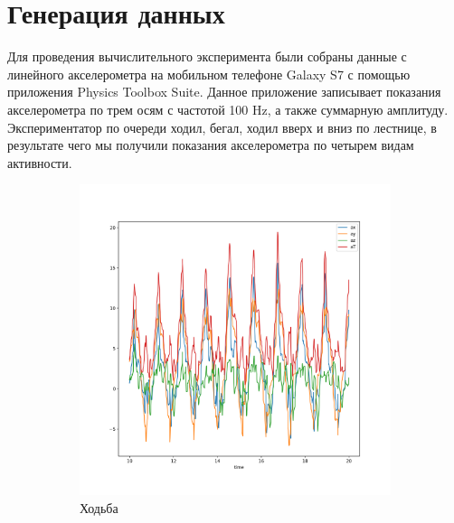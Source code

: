 \documentclass[12pt, fleqn, unicode]{article}
\begin{document}
\newpage
\section{Генерация данных}

Для проведения вычислительного эксперимента были собраны данные с линейного
акселерометра на мобильном телефоне Galaxy S7 с помощью приложения
Physics Toolbox Suite. %
Данное приложение записывает показания акселерометра по трем осям с частотой 100 Hz,
а также суммарную амплитуду. Экспериментатор по очереди ходил, бегал, ходил вверх
и вниз по лестнице, в результате чего мы получили показания акселерометра по
четырем видам активности.

\begin{figure}
    \begin{subfigure}[b]{0.5\textwidth}
        \centering
        \includegraphics[width=.9\linewidth]{../pics/raw_walking.png}
        \caption{Ходьба}
        \label{fig:sfig1}
    \end{subfigure}
    \begin{subfigure}[b]{0.5\textwidth}
        \centering

\end{subfigure}
\end{figure}
\end{document}
